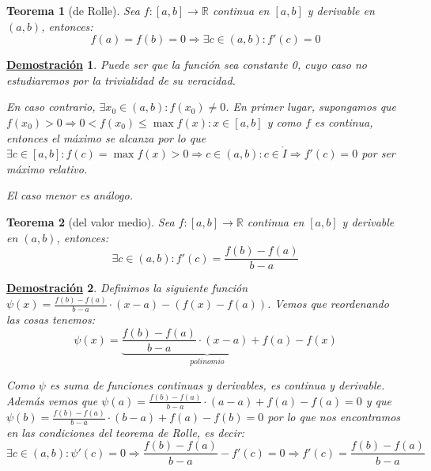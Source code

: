 \documentclass[10pt,a4paper,openright]{book}
\theoremstyle{break}
\newtheorem{theo}{Teorema}[chapter]
\newtheorem*{demo}{\underline{Demostración}}
\begin{document}
\begin{theo}[de Rolle]
Sea $f: [a,b]\rightarrow \mathbb R$ continua en $[a,b]$ y derivable en $(a,b)$, entonces:
$$f(a)=f(b)=0\Rightarrow \exists c\in (a,b): f'(c)=0$$
\end{theo}
\begin{demo}
Puede ser que la función sea constante 0, cuyo caso no estudiaremos por la trivialidad de su veracidad.
\begin{center}
\end{center}

En caso contrario, $\exists x_0\in (a,b):f(x_0)\neq 0$. En primer lugar, supongamos que $f(x_0)>0\Rightarrow 0<f(x_0)\leq \max{f(x)}: x\in [a,b]$ y como $f$ es continua, entonces el máximo se alcanza por lo que $\exists c\in [a,b]: f(c)=\max{f(x)}>0\Rightarrow c\in (a,b): c\in \mathring{I}\Rightarrow f'(c) = 0$ por ser máximo relativo.

El caso menor es análogo.
\end{demo}

\begin{theo}[del valor medio]
Sea $f:[a,b]\rightarrow\mathbb R$ continua en $[a,b]$ y derivable en $(a,b)$, entonces:
$$\exists c \in (a,b): f'(c)=\frac{f(b)-f(a)}{b-a}$$
\end{theo}
\begin{demo}
Definimos la siguiente función $\psi(x)=\frac{f(b)-f(a)}{b-a}\cdot (x-a)-(f(x)-f(a))$. Vemos que reordenando las cosas tenemos:
$$\psi(x)=\underbrace{\frac{f(b)-f(a)}{b-a}\cdot (x-a)+f(a)}_{polinomio}-f(x)$$

Como $\psi$ es suma de funciones continuas y derivables, es continua y derivable. Además vemos que $\psi(a)=\frac{f(b)-f(a)}{b-a}\cdot (a-a)+f(a)-f(a)=0$ y que $\psi(b)=\frac{f(b)-f(a)}{b-a}\cdot (b-a)+f(a)-f(b)=0$ por lo que nos encontramos en las condiciones del teorema de Rolle, es decir:
$$\exists c\in (a,b): \psi'(c)=0\Rightarrow \frac{f(b)-f(a)}{b-a}-f'(c)=0\Rightarrow f'(c)=\frac{f(b)-f(a)}{b-a}$$
\end{demo}
\end{document}
